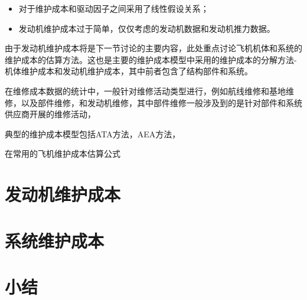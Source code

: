 \begin{itemize}
    \item 对于维护成本和驱动因子之间采用了线性假设关系；
    \item 发动机维护成本过于简单，仅仅考虑的发动机数据和发动机推力数据。
\end{itemize}

由于发动机维护成本将是下一节讨论的主要内容，此处重点讨论飞机机体和系统的维护成本的估算方法。这也是主要的维护成本模型中采用的维护成本的分解方法-机体维护成本和发动机维护成本，其中前者包含了结构部件和系统。

在维修成本数据的统计中，一般针对维修活动类型进行，例如航线维修和基地维修，以及部件维修，和发动机维修，其中部件维修一般涉及到的是针对部件和系统供应商开展的维修活动，

典型的维护成本模型包括ATA方法，AEA方法，

在常用的飞机维护成本估算公式

\section{发动机维护成本}


\section{系统维护成本}



\section{小结}
